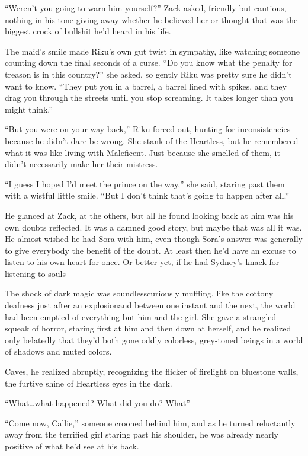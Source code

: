 ``Weren't you going to warn him yourself?'' Zack asked, friendly but cautious, nothing in his tone giving away whether he believed her or thought that was the biggest crock of bullshit he'd heard in his life.

The maid's smile made Riku's own gut twist in sympathy, like watching someone counting down the final seconds of a curse. ``Do you know what the penalty for treason is in this country?'' she asked, so gently Riku was pretty sure he didn't want to know. ``They put you in a barrel, a barrel lined with spikes, and they drag you through the streets until you stop screaming. It takes longer than you might think.''

``But you were on your way back,'' Riku forced out, hunting for inconsistencies because he didn't dare be wrong. She stank of the Heartless, but he remembered what it was like living with Maleficent. Just because she smelled of them, it didn't necessarily make her their mistress.

``I guess I hoped I'd meet the prince on the way,'' she said, staring past them with a wistful little smile. ``But I don't think that's going to happen after all.''

He glanced at Zack, at the others, but all he found looking back at him was his own doubts reflected. It was a damned good story, but maybe that was all it was. He almost wished he had Sora with him, even though Sora's answer was generally to give everybody the benefit of the doubt. At least then he'd have an excuse to listen to his own heart for once. Or better yet, if he had Sydney's knack for listening to souls\textemdash 

The shock of dark magic was soundless\textemdash curiously muffling, like the cottony deafness just after an explosion\textemdash and between one instant and the next, the world had been emptied of everything but him and the girl. She gave a strangled squeak of horror, staring first at him and then down at herself, and he realized only belatedly that they'd both gone oddly colorless, grey-toned beings in a world of shadows and muted colors.

Caves, he realized abruptly, recognizing the flicker of firelight on bluestone walls, the furtive shine of Heartless eyes in the dark.

``What\ldots what happened? What did you do? What\textemdash ''

``Come now, Callie,'' someone crooned behind him, and as he turned reluctantly away from the terrified girl staring past his shoulder, he was already nearly positive of what he'd see at his back.

